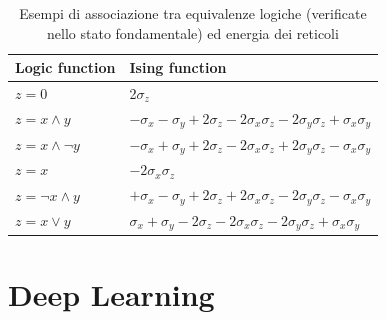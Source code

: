 \documentclass[Lau, noexaminfo, oneside]{sapthesis} %
\begin{document}
\begin{table}[H]
\begin{tabular}{l|l}
Logic function & Ising function\\
\hline
$z = 0$        & 2$\sigma_z$                                                                                   \\
$z = x \wedge y$    & $-\sigma_x - \sigma_y + 2\sigma_z - 2\sigma_x\sigma_z - 2\sigma_y\sigma_z + \sigma_x\sigma_y$ \\
$z = x \wedge \lnot y$   & $-\sigma_x + \sigma_y + 2\sigma_z - 2\sigma_x\sigma_z + 2\sigma_y\sigma_z - \sigma_x\sigma_y$ \\
$z = x$        & $-2\sigma_x\sigma_z$                                                                          \\
$z = \lnot x \wedge y$   & $+\sigma_x - \sigma_y + 2\sigma_z + 2\sigma_x\sigma_z - 2\sigma_y\sigma_z - \sigma_x\sigma_y$ \\

$z = x \vee y $   & $\sigma_x + \sigma_y - 2\sigma_z - 2\sigma_x\sigma_z - 2\sigma_y\sigma_z + \sigma_x\sigma_y$  \\

\end{tabular}
\centering
\caption{Esempi di associazione tra equivalenze logiche (verificate nello stato fondamentale) ed energia dei reticoli \cite{quantumannealing}}
\end{table}
\chapter{Deep Learning}
\end{document}

